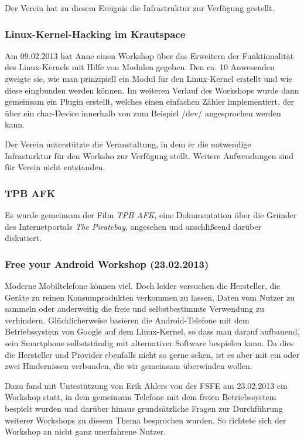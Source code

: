 \documentclass[10pt,DIV16]{scrartcl}
\begin{document}
Der Verein hat zu diesem Ereignis die Infrastruktur zur Verfügung 
gestellt. 

\subsubsection{Linux-Kernel-Hacking im Krautspace}

Am 09.02.2013 hat Anne einen Workshop über das Erweitern der
Funktionalität des Linux-Kernels mit Hilfe von Modulen gegeben. Den
ca. 10 Anwesenden zweigte sie, wie man prinzipiell ein Modul für den
Linux-Kernel erstellt und wie diese eingbunden werden können. Im
weiteren Verlauf des Workshops wurde dann gemeinsam ein Plugin
erstellt, welches einen einfachen Zähler implementiert, der über ein
char-Device innerhalb von zum Beispiel /dev/ angesprochen werden
kann.

Der Verein unterstützte die Veranstaltung, in dem er die notwendige
Infrasturktur für den Worksho zur Verfügung stellt. Weitere
Aufwendungen sind für Verein nicht entstanden.

\subsubsection{TPB AFK}

Es wurde gemeinsam der Film \textit{TPB AFK}, eine Dokumentation
über die Gründer des Internetportals \textit {The Piratebay}, angesehen und
anschlißeend darüber diskutiert.

\subsubsection{Free your Android Workshop (23.02.2013)}

Moderne Mobiltelefone können viel. Doch leider versuchen die Hersteller,
die Geräte zu reinen Konsumprodukten verkommen zu lassen, Daten vom
Nutzer zu sammeln oder anderweitig die freie und selbstbestimmte
Verwendung zu verhindern. Glücklicherweise basieren die
Android-Telefone mit dem Betriebssystem von Google auf dem
Linux-Kernel, so dass man darauf aufbauend, sein Smartphone
selbstständig mit alternativer Software bespielen kann. Da dies die
Hersteller und Provider ebenfalls nicht so gerne sehen, ist es
aber mit ein oder zwei Hindernissen verbunden, die wir gemeinsam
überwinden wollen.

Dazu fand mit Untestützung von Erik Ahlers von der FSFE am 23.02.2013
ein Workshop statt, in dem gemeinsam Telefone mit dem freien
Betriebssystem bespielt wurden und darüber hinaus grundsätzliche
Fragen zur Durchführung weiterer Workshops zu diesem Thema
besprochen wurden. So richtete sich der Workshop an nicht ganz 
unerfahrene Nutzer.
\end{document}
